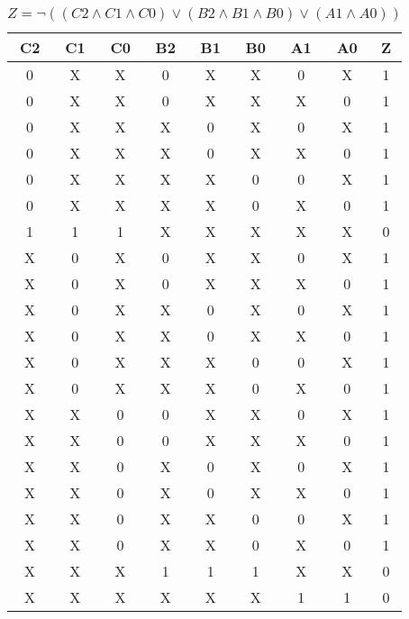 \begin{center}
    \begin{table}[h] \caption{\(Z = \lnot ((C2 \land C1 \land C0) \lor (B2 \land B1 \land B0) \lor (A1 \land A0)) \)}
        \begin{center}
            \begin{tabular}{|c|c|c|c|c|c|c|c||c|} \hline
            C2 & C1 & C0 & B2 & B1 & B0 & A1 & A0 & Z \\ \hline\hline
            0  & X  & X  & 0  & X  & X  & 0  & X  & 1 \\ \hline
            0  & X  & X  & 0  & X  & X  & X  & 0  & 1 \\ \hline
            0  & X  & X  & X  & 0  & X  & 0  & X  & 1 \\ \hline
            0  & X  & X  & X  & 0  & X  & X  & 0  & 1 \\ \hline
            0  & X  & X  & X  & X  & 0  & 0  & X  & 1 \\ \hline
            0  & X  & X  & X  & X  & 0  & X  & 0  & 1 \\ \hline
            1  & 1  & 1  & X  & X  & X  & X  & X  & 0 \\ \hline
            X  & 0  & X  & 0  & X  & X  & 0  & X  & 1 \\ \hline
            X  & 0  & X  & 0  & X  & X  & X  & 0  & 1 \\ \hline
            X  & 0  & X  & X  & 0  & X  & 0  & X  & 1 \\ \hline
            X  & 0  & X  & X  & 0  & X  & X  & 0  & 1 \\ \hline
            X  & 0  & X  & X  & X  & 0  & 0  & X  & 1 \\ \hline
            X  & 0  & X  & X  & X  & 0  & X  & 0  & 1 \\ \hline
            X  & X  & 0  & 0  & X  & X  & 0  & X  & 1 \\ \hline
            X  & X  & 0  & 0  & X  & X  & X  & 0  & 1 \\ \hline
            X  & X  & 0  & X  & 0  & X  & 0  & X  & 1 \\ \hline
            X  & X  & 0  & X  & 0  & X  & X  & 0  & 1 \\ \hline
            X  & X  & 0  & X  & X  & 0  & 0  & X  & 1 \\ \hline
            X  & X  & 0  & X  & X  & 0  & X  & 0  & 1 \\ \hline
            X  & X  & X  & 1  & 1  & 1  & X  & X  & 0 \\ \hline
            X  & X  & X  & X  & X  & X  & 1  & 1  & 0 \\ \hline
            \end{tabular}
        \end{center}
    \end{table}
\end{center}
